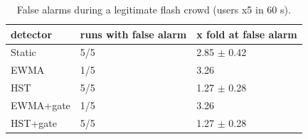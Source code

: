 \begin{table}[t]
\centering\small
\caption{False alarms during a legitimate flash crowd (users x5 in 60 s).}\label{tab:false-alarms}
\begin{tabular}{lll}
\toprule
detector & runs with false alarm & x fold at false alarm \\
\midrule
Static & 5/5 & 2.85 $\pm$ 0.42 \\
EWMA & 1/5 & 3.26 \\
HST & 5/5 & 1.27 $\pm$ 0.28 \\
EWMA+gate & 1/5 & 3.26 \\
HST+gate & 5/5 & 1.27 $\pm$ 0.28 \\
\bottomrule
\end{tabular}
\end{table}

